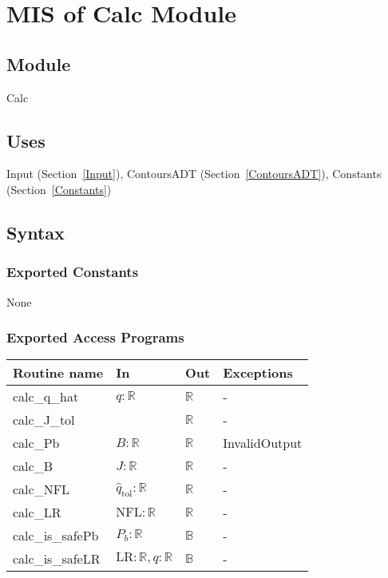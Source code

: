 \documentclass[12pt, titlepage]{article}
\begin{document}
\newpage


\section{MIS of Calc Module} \label{Calc}

\subsection {Module}

Calc

\subsection {Uses}

Input (Section~\ref{Input}), ContoursADT (Section~\ref{ContoursADT}), Constants
(Section~\ref{Constants})

\subsection {Syntax}

\subsubsection {Exported Constants}

None

\subsubsection {Exported Access Programs}

\begin{tabular}{| l | p{7cm} | l | l |}
\hline
\textbf{Routine name} & \textbf{In} & \textbf{Out} & \textbf{Exceptions}\\
\hline
calc\_q\_hat & $q: \mathbb{R}$ & $\mathbb{R}$ & -\\
\hline
calc\_J\_tol &  & $\mathbb{R}$ & -\\
\hline
calc\_Pb & $B: \mathbb{R}$ & $\mathbb{R}$ & InvalidOutput\\
\hline
calc\_B & $J: \mathbb{R}$ & $\mathbb{R}$ & -\\
\hline
calc\_NFL & $\hat{q}_\text{tol}: \mathbb{R}$ & $\mathbb{R}$ & -\\
\hline
calc\_LR & $\text{NFL}: \mathbb{R}$ & $\mathbb{R}$ & -\\
\hline
calc\_is\_safePb & $\mathit{P_b}: \mathbb{R}$ & $\mathbb{B}$ & -\\
\hline
calc\_is\_safeLR & $\text{LR}: \mathbb{R}, q : \mathbb{R}$ & $\mathbb{B}$ & -\\
\hline
\end{tabular}
\end{document}
